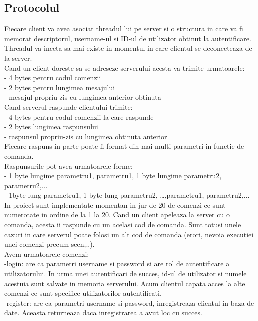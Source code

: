 \documentclass[runningheads]{llncs}
\begin{document}
\subsection{Protocolul}
Fiecare client va avea asociat threadul lui pe server si o structura in care va fi memorat descriptorul, username-ul si ID-ul de utilizator obtinut la autentificare. Threadul va inceta sa mai existe in momentul in care clientul se deconecteaza de la server. \\
Cand un client doreste sa se adreseze serverului acesta va trimite urmatoarele:\\
- 4 bytes pentru codul comenzii\\
- 2 bytes pentru lungimea mesajului\\
- mesajul propriu-zis cu lungimea anterior obtinuta\\
Cand serverul raspunde clientului trimite:\\
- 4 bytes pentru codul comenzii la care raspunde\\
- 2 bytes lungimea raspunsului\\
- raspunsul propriu-zis cu lungimea obtinuta anterior\\
Fiecare raspuns in parte poate fi format din mai multi parametri in functie de comanda.\\
Raspunsurile pot avea urmatoarele forme: \\
- 1 byte lungime parametru1, parametru1, 1 byte lungime parametru2, parametru2,...\\
- 1byte lung parametru1, 1 byte lung parametru2, …,parametru1, parametru2,...\\
In proiect sunt implementate momentan in jur de 20 de comenzi ce sunt numerotate in ordine de la 1 la 20. Cand un client apeleaza la server cu o comanda, acesta ii raspunde cu un acelasi cod de comanda. Sunt totusi unele cazuri in care serverul poate folosi un alt cod de comanda (erori, nevoia executiei unei comenzi precum seen,..).\\
Avem urmatoarele comenzi:\\
-login: are ca parametri username si password si are rol de autentificare a utilizatorului. In urma unei autentificari de succes, id-ul de utilizator si numele acestuia sunt salvate in memoria serverului. Acum clientul capata acces la alte comenzi ce sunt specifice utilizatorilor autentificati.\\
-register: are ca parametri username si password, inregistreaza clientul in baza de date. Aceasta returneaza daca inregistrarea a avut loc cu succes.\\
\end{document}
